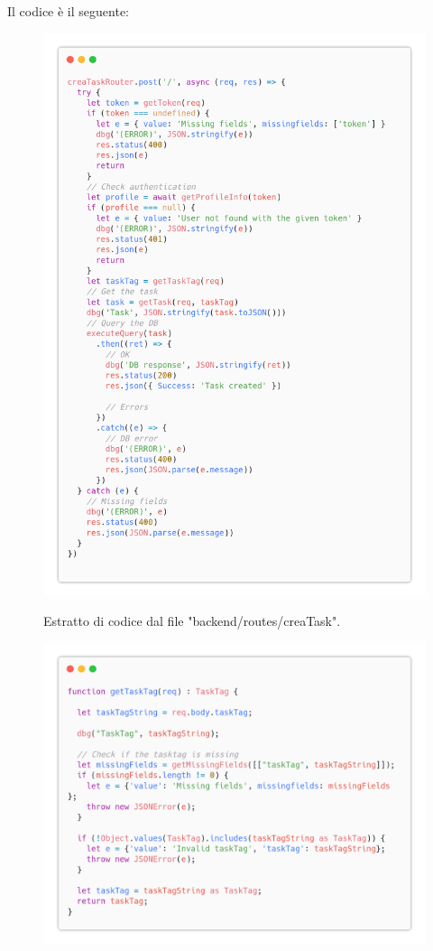 \documentclass{report}
\begin{document}
Il codice è il seguente:
\begin{figure}[H]
	\centering\includegraphics[width=1\textwidth]{images/code_crea_task.png}
	
	Estratto di codice dal file "backend/routes/creaTask".
\end{figure}
\begin{figure}[H]
	\centering\includegraphics[width=1\textwidth]{images/code_crea_task2.png}
\end{figure}
\end{document}
